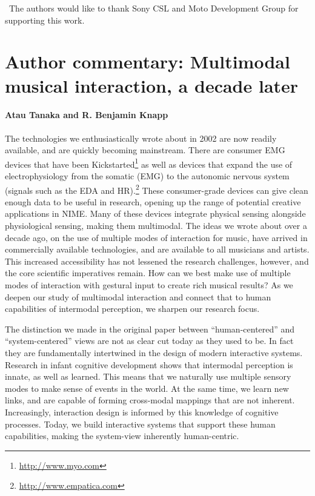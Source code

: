 \begin{acknowledgement}
\
The authors would like to thank Sony CSL and Moto Development Group for supporting this work.
\end{acknowledgement}

\section*{Author commentary: Multimodal musical interaction, a decade later}
\paragraph{Atau Tanaka and R. Benjamin Knapp}

The technologies we enthusiastically wrote about in 2002 are now readily available, and are quickly becoming mainstream. There are consumer EMG devices that have been Kickstarted\footnote{\url{http://www.myo.com}} as well as devices that expand the use of electrophysiology from the somatic (EMG) to the autonomic nervous system (signals such as the EDA and HR).\footnote{\url{http://www.empatica.com}} These consumer-grade devices can give clean enough data to be useful in research, opening up the range of potential creative applications in NIME. Many of these devices integrate physical sensing alongside physiological sensing, making them multimodal. The ideas we wrote about over a decade ago, on the use of multiple modes of interaction for music, have arrived in commercially available technologies, and are available to all musicians and artists. This increased accessibility has not lessened the research challenges, however, and the core scientific imperatives remain. How can we best make use of multiple modes of interaction with gestural input to create rich musical results? As we deepen our study of multimodal interaction and connect that to human capabilities of intermodal perception, we sharpen our research focus. 


The distinction we made in the original paper between ``human-centered'' and ``system-centered'' views are not as clear cut today as they used to be. In fact they are fundamentally intertwined in the design of modern interactive systems. Research in infant cognitive development shows that intermodal perception is innate, as well as learned. 
This means that we naturally use multiple sensory modes to make sense of events in the world. At the same time, we learn new links, and are capable of forming cross-modal mappings that are not inherent. Increasingly, interaction design is informed by this knowledge of cognitive processes. Today, we build interactive systems that support these human capabilities, making the system-view inherently human-centric.

